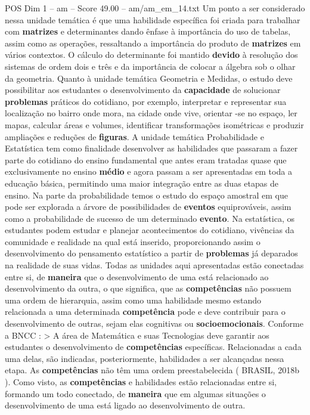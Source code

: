 \begin{textsample}{POS Dim 1 – am – Score 49.00 – am/am\_em\_14.txt}
Um ponto a ser considerado nessa unidade temática é que uma habilidade específica foi criada para trabalhar com \textbf{matrizes} e determinantes dando ênfase à importância do uso de tabelas, assim como as operações, ressaltando a importância do produto de \textbf{matrizes} em vários contextos.
O cálculo do determinante foi mantido \textbf{devido} à resolução dos sistemas de ordem dois e três e da importância de colocar a álgebra sob o olhar da geometria.
Quanto à unidade temática Geometria e Medidas, o estudo deve possibilitar aos estudantes o desenvolvimento da \textbf{capacidade} de solucionar \textbf{problemas} práticos do cotidiano, por exemplo, interpretar e representar sua localização no bairro onde mora, na cidade onde vive, orientar -se no espaço, ler mapas, calcular áreas e volumes, identificar transformações isométricas e produzir ampliações e reduções de \textbf{figuras}.
A unidade temática Probabilidade e Estatística tem como finalidade desenvolver as habilidades que passaram a fazer parte do cotidiano do ensino fundamental que antes eram tratadas quase que exclusivamente no ensino \textbf{médio} e agora passam a ser apresentadas em toda a educação básica, permitindo uma maior integração entre as duas etapas de ensino.
Na parte da probabilidade temos o estudo do espaço amostral em que pode ser explorada a árvore de possibilidades de \textbf{eventos} equiprováveis, assim como a probabilidade de sucesso de um determinado \textbf{evento}.
Na estatística, os estudantes podem estudar e planejar acontecimentos do cotidiano, vivências da comunidade e realidade na qual está inserido, proporcionando assim o desenvolvimento do pensamento estatístico a partir de \textbf{problemas} já deparados na realidade de suas vidas.
Todas as unidades aqui apresentadas estão conectadas entre si, de \textbf{maneira} que o desenvolvimento de uma está relacionado ao desenvolvimento da outra, o que significa, que as \textbf{competências} não possuem uma ordem de hierarquia, assim como uma habilidade mesmo estando relacionada a uma determinada \textbf{competência} pode e deve contribuir para o desenvolvimento de outras, sejam elas cognitivas ou \textbf{socioemocionais}.
Conforme a BNCC : > A área de Matemática e suas Tecnologias deve garantir aos estudantes o desenvolvimento de \textbf{competências} específicas.
Relacionadas a cada uma delas, são indicadas, posteriormente, habilidades a ser alcançadas nessa etapa.
As \textbf{competências} não têm uma ordem preestabelecida ( BRASIL, 2018b ).
Como visto, as \textbf{competências} e habilidades estão relacionadas entre si, formando um todo conectado, de \textbf{maneira} que em algumas situações o desenvolvimento de uma está ligado ao desenvolvimento de outra.

\end{textsample}
